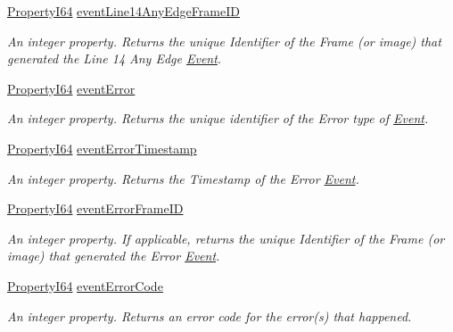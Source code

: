 \begin{DoxyCompactItemize}
\hyperlink{group___common_interface_ga81749b2696755513663492664a18a893}{Property\+I64} \hyperlink{classmv_i_m_p_a_c_t_1_1acquire_1_1_gen_i_cam_1_1_event_control_ad73cb5c047415e4161d530b41a3b69e7}{event\+Line14\+Any\+Edge\+Frame\+I\+D}
\begin{DoxyCompactList}\small\item\em An integer property. Returns the unique Identifier of the Frame (or image) that generated the Line 14 Any Edge \hyperlink{classmv_i_m_p_a_c_t_1_1acquire_1_1_event}{Event}. \end{DoxyCompactList}\item 
\hyperlink{group___common_interface_ga81749b2696755513663492664a18a893}{Property\+I64} \hyperlink{classmv_i_m_p_a_c_t_1_1acquire_1_1_gen_i_cam_1_1_event_control_a6375c2352bb93b3f9f8c641d009686c7}{event\+Error}
\begin{DoxyCompactList}\small\item\em An integer property. Returns the unique identifier of the Error type of \hyperlink{classmv_i_m_p_a_c_t_1_1acquire_1_1_event}{Event}. \end{DoxyCompactList}\item 
\hyperlink{group___common_interface_ga81749b2696755513663492664a18a893}{Property\+I64} \hyperlink{classmv_i_m_p_a_c_t_1_1acquire_1_1_gen_i_cam_1_1_event_control_ac871b5c03dcd067b4a46162e003c2e50}{event\+Error\+Timestamp}
\begin{DoxyCompactList}\small\item\em An integer property. Returns the Timestamp of the Error \hyperlink{classmv_i_m_p_a_c_t_1_1acquire_1_1_event}{Event}. \end{DoxyCompactList}\item 
\hyperlink{group___common_interface_ga81749b2696755513663492664a18a893}{Property\+I64} \hyperlink{classmv_i_m_p_a_c_t_1_1acquire_1_1_gen_i_cam_1_1_event_control_a1787e2a213e7cf1faa92ff71ed8eb7cb}{event\+Error\+Frame\+I\+D}
\begin{DoxyCompactList}\small\item\em An integer property. If applicable, returns the unique Identifier of the Frame (or image) that generated the Error \hyperlink{classmv_i_m_p_a_c_t_1_1acquire_1_1_event}{Event}. \end{DoxyCompactList}\item 
\hyperlink{group___common_interface_ga81749b2696755513663492664a18a893}{Property\+I64} \hyperlink{classmv_i_m_p_a_c_t_1_1acquire_1_1_gen_i_cam_1_1_event_control_aafc14b4ed8b2aab215476207a4e28bc5}{event\+Error\+Code}
\begin{DoxyCompactList}\small\item\em An integer property. Returns an error code for the error(s) that happened. \end{DoxyCompactList}\end{DoxyCompactItemize}


